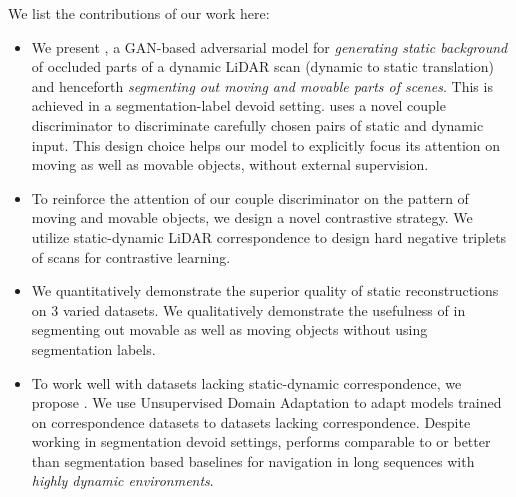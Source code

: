 We list the contributions of our work here:
\begin{itemize}

    \item We present \dslr{}, a GAN-based adversarial model for \textit{generating static background} of occluded parts of a dynamic LiDAR scan (dynamic to static translation) and henceforth \textit{segmenting out moving and movable  parts of scenes}. This is achieved in a segmentation-label devoid setting. \dslr{} uses a novel couple discriminator to discriminate carefully chosen pairs of static and dynamic input. This design choice helps our model to explicitly focus its attention on moving as well as movable objects, without external supervision.
 
    \item To reinforce the attention of our couple discriminator on the pattern of moving and movable objects, we design a novel contrastive strategy. We utilize static-dynamic LiDAR correspondence to design hard negative triplets of scans for contrastive learning. 
    
    \item We quantitatively demonstrate the superior quality of static reconstructions on 3 varied datasets. We qualitatively demonstrate the usefulness of \dslr{} in segmenting out movable as well as moving objects without using segmentation labels. 
       \item To work well with datasets lacking static-dynamic correspondence, we propose \dslruda{}. We use Unsupervised Domain Adaptation to adapt models trained on correspondence datasets to datasets lacking correspondence. Despite working in segmentation devoid settings, \dslruda{} performs comparable to or better than segmentation based baselines for navigation in long sequences with \textit{highly dynamic environments}.
\end{itemize}